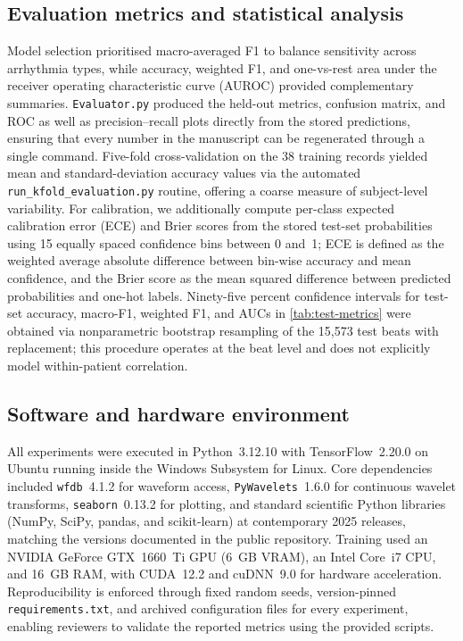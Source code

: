 \subsection{Evaluation metrics and statistical analysis}
Model selection prioritised macro-averaged F1 to balance sensitivity across arrhythmia types, while accuracy, weighted F1, and one-vs-rest area under the receiver operating characteristic curve (AUROC) provided complementary summaries. \texttt{Evaluator.py} produced the held-out metrics, confusion matrix, and ROC as well as precision--recall plots directly from the stored predictions, ensuring that every number in the manuscript can be regenerated through a single command. Five-fold cross-validation on the 38 training records yielded mean and standard-deviation accuracy values via the automated \texttt{run\_kfold\_evaluation.py} routine, offering a coarse measure of subject-level variability. For calibration, we additionally compute per-class expected calibration error (ECE) and Brier scores from the stored test-set probabilities using 15 equally spaced confidence bins between 0 and~1; ECE is defined as the weighted average absolute difference between bin-wise accuracy and mean confidence, and the Brier score as the mean squared difference between predicted probabilities and one-hot labels.
Ninety-five percent confidence intervals for test-set accuracy, macro-F1, weighted F1, and AUCs in \autoref{tab:test-metrics} were obtained via nonparametric bootstrap resampling of the 15{,}573 test beats with replacement; this procedure operates at the beat level and does not explicitly model within-patient correlation.

\subsection{Software and hardware environment}
All experiments were executed in Python~3.12.10 with TensorFlow~2.20.0 on Ubuntu running inside the Windows Subsystem for Linux. Core dependencies included \texttt{wfdb}~4.1.2 for waveform access, \texttt{PyWavelets}~1.6.0 for continuous wavelet transforms, \texttt{seaborn}~0.13.2 for plotting, and standard scientific Python libraries (NumPy, SciPy, pandas, and scikit-learn) at contemporary 2025 releases, matching the versions documented in the public repository. Training used an NVIDIA GeForce GTX~1660~Ti GPU (6~GB VRAM), an Intel Core~i7 CPU, and 16~GB RAM, with CUDA~12.2 and cuDNN~9.0 for hardware acceleration.
Reproducibility is enforced through fixed random seeds, version-pinned \texttt{requirements.txt}, and archived configuration files for every experiment, enabling reviewers to validate the reported metrics using the provided scripts.
